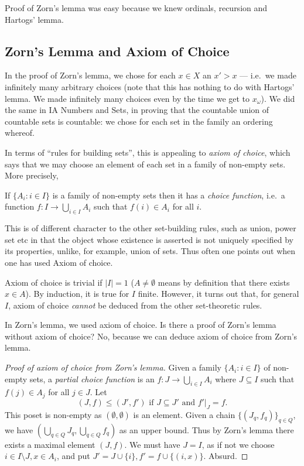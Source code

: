 \documentclass[a4paper]{article}
\begin{document}
\begin{remark}
  Proof of Zorn's lemma was easy because we knew ordinals, recursion  and Hartogs' lemma.
\end{remark}

\subsection{Zorn's Lemma and Axiom of Choice}

In the proof of Zorn's lemma, we chose for each \(x \in X\) an \(x' > x\) --- i.e.\ we made infinitely many arbitrary choices (note that this has nothing to do with Hartogs' lemma. We made infinitely many choices even by the time we get to \(x_\omega\)). We did the same in IA Numbers and Sets, in proving that the countable union of countable sets is countable: we chose for each set in the family an ordering whereof.

In terms of ``rules for building sets'', this is appealing to \emph{axiom of choice}, which says that we may choose an element of each set in a family of non-empty sets. More precisely,

\begin{axiom}
  If \(\{A_i: i \in I\}\) is a family of non-empty sets then it has a \emph{choice function}, i.e.\ a function \(f: I \to \bigcup_{i \in I} A_i\) such that \(f(i) \in A_i\) for all \(i\).
\end{axiom}

This is of different character to the other set-building rules, such as union, power set etc in that the object whose existence is asserted is not uniquely specified by its properties, unlike, for example, union of sets. Thus often one points out when one has used Axiom of choice.

\begin{remark}
  Axiom of choice is trivial if \(|I| = 1\) (\(A \neq \emptyset\) means by definition that there exists \(x \in A\)). By induction, it is true for \(I\) finite. However, it turns out that, for general \(I\), axiom of choice \emph{cannot} be deduced from the other set-theoretic rules.
\end{remark}

In Zorn's lemma, we used axiom of choice. Is there a proof of Zorn's lemma without axiom of choice? No, because we can deduce axiom of choice from Zorn's lemma.

\begin{proof}[Proof of axiom of choice from Zorn's lemma]
  Given a family \(\{A_i: i \in I\}\) of non-empty sets, a \emph{partial choice function} is an \(f: J \to \bigcup_{i \in I} A_i\) where \(J \subseteq I\) such that \(f(j) \in A_j\) for all \(j \in J\). Let
  \[
    (J, f) \leq (J', f') \text{ if } J \subseteq J' \text{ and } f'|_J = f.
  \]
  This poset is non-empty as \((\emptyset, \emptyset)\) is an element. Given a chain \(\{(J_q, f_q)\}_{q \in Q}\), we have \((\bigcup_{q \in Q} J_q, \bigcup_{q \in Q} f_q)\) as an upper bound. Thus by Zorn's lemma there exists a maximal element \((J, f)\). We must have \(J = I\), as if not we choose \(i \in I \setminus J, x \in A_i\), and put \(J' = J \cup \{i\}, f' = f \cup \{(i, x)\}\). Absurd.
\end{proof}
\end{document}
